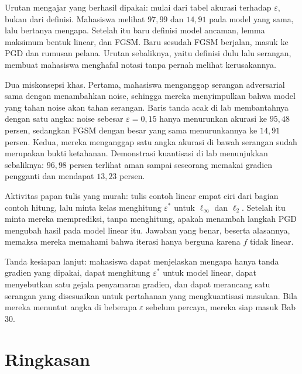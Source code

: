 \begin{untukdosen}
Urutan mengajar yang berhasil dipakai: mulai dari tabel akurasi terhadap
$\varepsilon$, bukan dari definisi. Mahasiswa melihat $97{,}99$ dan $14{,}91$ pada
model yang sama, lalu bertanya mengapa. Setelah itu baru definisi model ancaman,
lemma maksimum bentuk linear, dan FGSM. Baru sesudah FGSM berjalan, masuk ke PGD dan
rumusan pelana. Urutan sebaliknya, yaitu definisi dulu lalu serangan, membuat
mahasiswa menghafal notasi tanpa pernah melihat kerusakannya.

Dua miskonsepsi khas. Pertama, mahasiswa menganggap serangan adversarial sama dengan
menambahkan noise, sehingga mereka menyimpulkan bahwa model yang tahan noise akan
tahan serangan. Baris tanda acak di lab membantahnya dengan satu angka: noise sebesar
$\varepsilon=0{,}15$ hanya menurunkan akurasi ke $95{,}48$ persen, sedangkan FGSM
dengan besar yang sama menurunkannya ke $14{,}91$ persen. Kedua, mereka menganggap
satu angka akurasi di bawah serangan sudah merupakan bukti ketahanan. Demonstrasi
kuantisasi di lab menunjukkan sebaliknya: $96{,}98$ persen terlihat aman sampai
seseorang memakai gradien pengganti dan mendapat $13{,}23$ persen.

Aktivitas papan tulis yang murah: tulis contoh linear empat ciri dari bagian contoh
hitung, lalu minta kelas menghitung $\varepsilon^{*}$ untuk $\ell_\infty$ dan
$\ell_2$. Setelah itu minta mereka memprediksi, tanpa menghitung, apakah menambah
langkah PGD mengubah hasil pada model linear itu. Jawaban yang benar, beserta
alasannya, memaksa mereka memahami bahwa iterasi hanya berguna karena $f$ tidak
linear.

Tanda kesiapan lanjut: mahasiswa dapat menjelaskan mengapa hanya tanda gradien yang
dipakai, dapat menghitung $\varepsilon^{*}$ untuk model linear, dapat menyebutkan
satu gejala penyamaran gradien, dan dapat merancang satu serangan yang disesuaikan
untuk pertahanan yang mengkuantisasi masukan. Bila mereka menuntut angka di beberapa
$\varepsilon$ sebelum percaya, mereka siap masuk Bab 30.
\end{untukdosen}

\section{Ringkasan}

